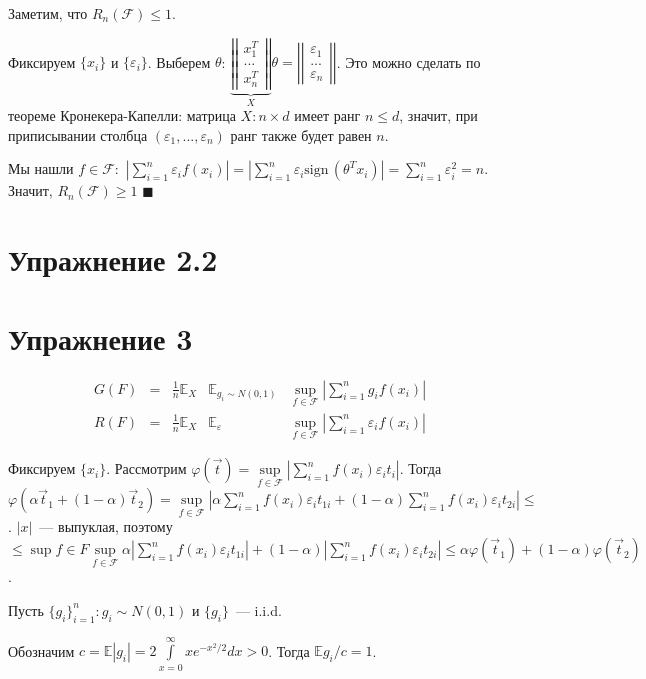 \documentclass[a4paper]{article}
\newcommand{\matrixl}{\left|\left|}
\newcommand{\matrixr}{\right|\right|}
\newcommand{\sign}{\mbox{sign}\,}
\newcommand{\F}{\mathcal{F}}
\newcommand{\E}{\mathbb{E}}
\def\eps{\varepsilon}
\begin{document}
Заметим, что $\boxed{R_n(\F)\leqslant 1}$.

Фиксируем $\{x_i\}$ и $\{\eps_i\}$. Выберем $\theta$: $\underbrace{\matrixl\begin{array}{c}
x_1^T\\
...\\
x_n^T
\end{array}\matrixr}_X\theta=\matrixl\begin{array}{c}
\eps_1\\
...\\
\eps_n
\end{array}
\matrixr$. Это можно сделать по теореме Кронекера-Капелли: матрица $X\colon n\times d$ имеет ранг $n\leqslant d$, значит, при приписывании столбца $(\eps_1,...,\eps_n)$ ранг также будет равен $n$.

Мы нашли $f\in\F\colon $ $|\sum\limits_{i=1}^n \eps_i f(x_i)|=|\sum\limits_{i=1}^n \eps_i \sign(\theta^Tx_i)|=\sum\limits_{i=1}^n \eps_i^2=n$. Значит, $\boxed{R_n(\F)\geqslant 1}$ $\blacksquare$
\section*{Упражнение 2.2}
\section*{Упражнение 3}
$$
\begin{array}{ccccc}
G(F)&=&\frac{1}{n}\E_X&\E_{g_i\sim N(0,1)}&\sup\limits_{f\in \F}|\sum\limits_{i=1}^n g_if(x_i)|\\
R(F)&=&\frac{1}{n}\E_X&\E_{\eps}&\sup\limits_{f\in \F}|\sum\limits_{i=1}^n \eps_if(x_i)|
\end{array}$$

Фиксируем $\{x_i\}$. Рассмотрим $\varphi(\vec{t})=\sup\limits_{f\in\F}|\sum\limits_{i=1}^n f(x_i)\eps_i t_i|$. Тогда $\varphi(\alpha\vec{t}_1+(1-\alpha)\vec{t}_2)=\sup\limits_{f\in\F}|\alpha\sum\limits_{i=1}^n f(x_i)\eps_i t_{1i}+(1-\alpha)\sum\limits_{i=1}^n f(x_i)\eps_i t_{2i}|\boxed{\leqslant}$. $|x|$~--- выпуклая, поэтому $\boxed{\leqslant}\sup f\in F\sup\limits_{f\in\F}\alpha|\sum\limits_{i=1}^n f(x_i)\eps_i t_{1i}|+(1-\alpha)|\sum\limits_{i=1}^n f(x_i)\eps_i t_{2i}|\leqslant \alpha\varphi(\vec{t}_1)+(1-\alpha)\varphi(\vec{t}_2)$.

Пусть $\{g_i\}_{i=1}^n\colon g_i\sim N(0,1)$ и $\{g_i\}$~--- i.i.d.

Обозначим $c=\mathbb{E}|g_i|=2\int\limits_{x=0}^\infty x e^{-x^2/2}dx >0$. Тогда $\E g_i/c=1$.
\end{document}
